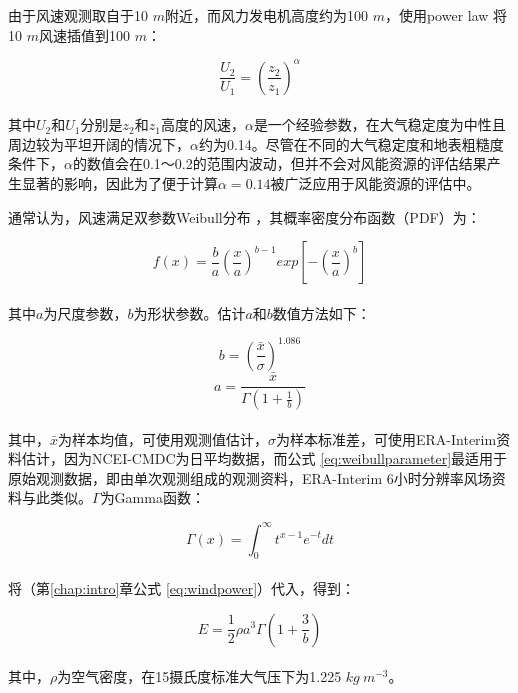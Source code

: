由于风速观测取自于10 $m$附近，而风力发电机高度约为100 $m$，使用power law \citep{peterson1978on}将10 $m$风速插值到100 $m$：

\begin{equation} \label{eq:powerlaw}
\frac{U_{2}}{U_{1}} = \left( \frac{z_{2}}{z_{1}} \right)^{\alpha}
\end{equation} ~\\
其中$U_{2}$和$U_{1}$分别是$z_{2}$和$z_{1}$高度的风速，$\alpha$是一个经验参数，在大气稳定度为中性且周边较为平坦开阔的情况下，$\alpha$约为0.14。尽管在不同的大气稳定度和地表粗糙度条件下，$\alpha$的数值会在0.1～0.2的范围内波动，但并不会对风能资源的评估结果产生显著的影响，因此为了便于计算$\alpha = 0.14$被广泛应用于风能资源的评估中\citep{peterson1978on, islam2011assessment, wang2016wind, argueso2018wind}。

通常认为，风速满足双参数Weibull分布 \citep{pryor2010climate}，其概率密度分布函数（PDF）为：

\begin{equation} \label{eq:weibull}
f(x) = \frac{b}{a} \left( \frac{x}{a} \right)^{b-1} exp \left[-\left(\frac{x}{a} \right)^{b} \right]
\end{equation} ~\\
其中$a$为尺度参数，$b$为形状参数。估计$a$和$b$数值方法如下\citep{monahan2006the1,monahan2006the2}：

\begin{equation} \label{eq:weibullparameter}
b = \left(\frac{\bar{x}}{\sigma} \right)^{1.086}
\end{equation}  
\vspace*{1ex}  
\begin{equation} \label{eq:weibullparameter2}
a = \frac{\bar{x}}{\Gamma \left(1 + \frac{1}{b} \right)}
\end{equation} ~\\
其中，$\bar{x}$为样本均值，可使用观测值估计，$\sigma$为样本标准差，可使用ERA-Interim资料估计，因为NCEI-CMDC为日平均数据，而公式 \ref{eq:weibullparameter}最适用于原始观测数据，即由单次观测组成的观测资料，ERA-Interim 6小时分辨率风场资料与此类似。$\Gamma$为Gamma函数：

\begin{equation} \label{eq:gammafunction}
\Gamma(x) = \int_{0}^{\infty} t^{x - 1} e^{-t} dt 
\end{equation} ~\\
将（第\ref{chap:intro}章公式  \ref{eq:windpower}）代入，得到：

\begin{equation} \label{eq:windpowerwithweibull}
E = \frac{1}{2} \rho a^{3} \Gamma \left( 1 + \frac{3}{b} \right)
\end{equation} ~\\
其中，$\rho$为空气密度，在15摄氏度标准大气压下为1.225 $kg ~ m^{-3}$。


